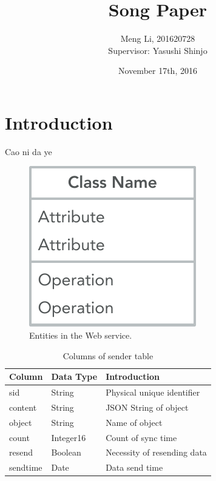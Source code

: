 \documentclass[twocolumn,10pt]{article}
\begin{document}
	
\date{November 17th, 2016}

\title{\bf Song Paper}

\author{
	Meng Li, 201620728  
	\\ Supervisor: Yasushi Shinjo
}

\maketitle

\section{Introduction}
Cao ni da ye\cite{dong2016aggregate}

\begin{figure}[t]
	\centering
	\includegraphics[scale=0.5]{1}
	\caption{Entities in the Web service.}
\end{figure}

\begin{table}[tbp]
	\centering  
	\begin{tabular}{lll}  
		\hline
		Column &Data Type & Introduction\\ 
		\hline  
		sid &String & Physical unique identifier\\
		content & String & JSON String of object\\ 
		object & String & Name of object\\
		count & Integer16 & Count of sync time\\
		resend & Boolean &Necessity of resending data \\
		sendtime & Date & Data send time\\
		\hline
	\end{tabular}
	\caption{Columns of sender table}
\end{table}


{
	\footnotesize
	
}
\end{document}
